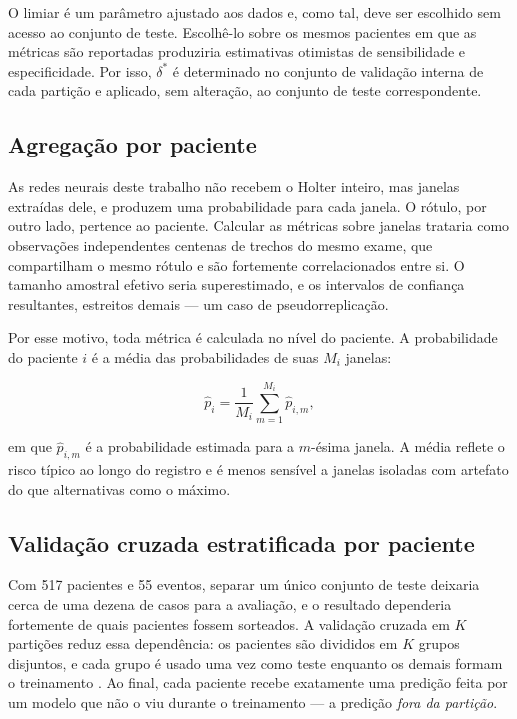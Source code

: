 O limiar é um parâmetro ajustado aos dados e, como tal, deve ser escolhido
sem acesso ao conjunto de teste. Escolhê-lo sobre os mesmos pacientes em que
as métricas são reportadas produziria estimativas otimistas de sensibilidade
e especificidade. Por isso, $\delta^{*}$ é determinado no conjunto de validação
interna de cada partição e aplicado, sem alteração, ao conjunto de teste
correspondente.

\subsection{Agregação por paciente}
\label{subsec:fund-agregacao}

As redes neurais deste trabalho não recebem o Holter inteiro, mas janelas
extraídas dele, e produzem uma probabilidade para cada janela. O rótulo, por
outro lado, pertence ao paciente. Calcular as métricas sobre janelas
trataria como observações independentes centenas de trechos do mesmo exame,
que compartilham o mesmo rótulo e são fortemente correlacionados entre si.
O tamanho amostral efetivo seria superestimado, e os intervalos de confiança
resultantes, estreitos demais --- um caso de pseudorreplicação.

Por esse motivo, toda métrica é calculada no nível do paciente. A
probabilidade do paciente $i$ é a média das probabilidades de suas $M_i$
janelas:

\begin{equation}
	\hat{p}_i = \frac{1}{M_i} \sum_{m=1}^{M_i} \hat{p}_{i,m},
	\label{eq:agregacao-paciente}
\end{equation}

\noindent
em que $\hat{p}_{i,m}$ é a probabilidade estimada para a $m$-ésima janela. A
média reflete o risco típico ao longo do registro e é menos sensível a
janelas isoladas com artefato do que alternativas como o máximo.

\subsection{Validação cruzada estratificada por paciente}
\label{subsec:fund-validacao-cruzada}

Com 517 pacientes e 55 eventos, separar um único conjunto de teste deixaria
cerca de uma dezena de casos para a avaliação, e o resultado dependeria
fortemente de quais pacientes fossem sorteados. A validação cruzada em $K$
partições reduz essa dependência: os pacientes são divididos em $K$ grupos
disjuntos, e cada grupo é usado uma vez como teste enquanto os demais formam
o treinamento \cite{kohavi1995study}. Ao final, cada paciente recebe
exatamente uma predição feita por um modelo que não o viu durante o
treinamento --- a predição \textit{fora da partição}.

